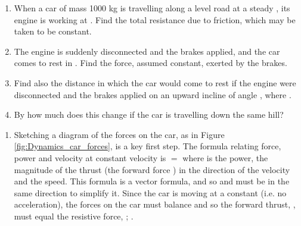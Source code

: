 
\begin{problem}[A1961AMIQ2a] %
{\begin{enumerate}
	\item When a car of mass 1000 kg is travelling along a level road at a steady , its engine is working at . Find the total resistance due to friction, which may be taken to be constant.
	\item The engine is suddenly disconnected and the brakes applied, and the car comes to rest in . Find the force, assumed constant, exerted by the brakes.
	\item Find also the distance in which the car would come to rest if the engine were disconnected and the brakes applied on an upward incline of angle \vari{\theta}, where .
	\item By how much does this change if the car is travelling down the same hill?
\end{enumerate}
}{
}{
\begin{enumerate}
	\item Sketching a diagram of the forces on the car, as in Figure \ref{fig:Dynamics_car_forces}, is a key first step. The formula relating force, power and velocity at constant velocity is  $=$  where  is the power,  the magnitude of the thrust (the forward force ) in the direction of the velocity and  the speed. This formula is a vector formula, and so  and  must be in the same direction to simplify it. Since the car is moving at a constant  (i.e. no acceleration), the forces on the car must balance and so the forward thrust, , must equal the resistive force, ; .


\end{enumerate}}
\end{problem}
